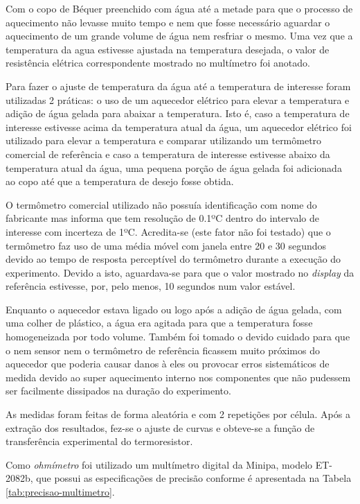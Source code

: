 \documentclass[a4paper]{instrumentacao}
\begin{document}
Com o copo de Béquer preenchido com água até a metade para que o processo de aquecimento não levasse muito tempo e nem que fosse necessário aguardar o aquecimento de um grande volume de água nem resfriar o mesmo. Uma vez que a temperatura da agua estivesse ajustada na temperatura desejada, o valor de resistência elétrica correspondente mostrado no multímetro foi anotado.

Para fazer o ajuste de temperatura da água até a temperatura de interesse foram utilizadas 2 práticas: o uso de um aquecedor elétrico para elevar a temperatura e adição de água gelada para abaixar a temperatura. Isto é, caso a temperatura de interesse estivesse acima da temperatura atual da água, um aquecedor elétrico foi utilizado para elevar a temperatura e comparar utilizando um termômetro comercial de referência e caso a temperatura de interesse estivesse abaixo da temperatura atual da água, uma pequena porção de água gelada foi adicionada ao copo até que a temperatura de desejo fosse obtida.

O termômetro comercial utilizado não possuía identificação com nome do fabricante mas informa que tem resolução de 0.1ºC dentro do intervalo de interesse com incerteza de 1ºC. Acredita-se (este fator não foi testado) que o termômetro faz uso de uma média móvel com janela entre 20 e 30 segundos devido ao tempo de resposta perceptível do termômetro durante a execução do experimento. Devido a isto, aguardava-se para que o valor mostrado no \textit{display} da referência estivesse, por, pelo menos, 10 segundos num valor estável.

Enquanto o aquecedor estava ligado ou logo após a adição de água gelada, com uma colher de plástico, a água era agitada para que a temperatura fosse homogeneizada por todo volume. Também foi tomado o devido cuidado para que o nem sensor nem o termômetro de referência ficassem muito próximos do aquecedor que poderia causar danos à eles ou provocar erros sistemáticos de medida devido ao super aquecimento interno nos componentes que não pudessem ser facilmente dissipados na duração do experimento.

As medidas foram feitas de forma aleatória e com 2 repetições por célula. Após a extração dos resultados, fez-se o ajuste de curvas e obteve-se a função de transferência experimental do termoresistor.

Como \textit{ohmímetro} foi utilizado um multímetro digital da Minipa, modelo ET-2082b, que possui as especificações de precisão conforme é apresentada na Tabela \ref{tab:precisao-multimetro}. 
\end{document}
